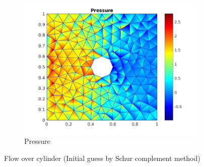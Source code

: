 \documentclass{beamer}
\begin{document}
\begin{frame}
\begin{figure}
\begin{subfigure}{0.3\textwidth}
    \includegraphics[width=\linewidth]{cylinder_newton_pressure_schur.jpg}
    \caption{Pressure}
  \label{pressure_navier_stoke_schur}
  \end{subfigure}
\caption{Flow over cylinder (Initial guess by Schur complement method)}
\label{flow_over_cylinder_schur_n_s}
\end{figure}
\end{frame}
\end{document}
